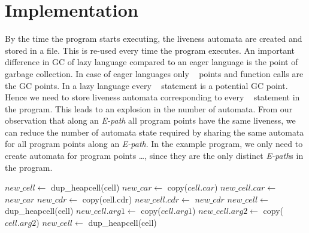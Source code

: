 \documentclass[10pt]{sigplanconf}
\begin{document}
\section{Implementation}
By the time the program starts executing, the liveness automata are created and stored in a file. 
This is re-used every time the program executes. 
An important difference in GC of lazy language compared to an eager language is the point of 
garbage collection. In case of eager languages only \CONS~ points and function calls are 
the GC points. In a lazy language every \LET~ statement is a potential GC point. Hence we need to store 
liveness automata corresponding to every \LET~ statement in the program. This leads to an explosion 
in the number of automata. From our observation that along an {\em E-path} all program points have 
the same liveness, we can reduce the number of automata state required by sharing the same automata 
for all program points along an {\em E-path}. In the example program, we only need to create automata 
for program points \ldots, since they are the only distinct {\em E-path}s in the program. 
\begin{algorithmic}
\STATE $new\_cell\gets$ dup\_heapcell(cell)
\STATE $new\_car\gets$ copy($cell.car$)
\STATE $new\_cell.car\gets$ $new\_car$ 
\STATE $new\_cdr\gets$ copy(cell.cdr)
\STATE $new\_cell.cdr\gets$ $new\_cdr$
\ELSE
{}
\STATE $new\_cell\gets$ dup\_heapcell(cell)
\STATE $new\_cell.arg1\gets$ copy($cell.arg1$)  
\STATE $new\_cell.arg2\gets$ copy($cell.arg2$)  
\ELSE
\STATE $new\_cell\gets$ dup\_heapcell(cell)
\ENDIF
\ENDIF
\end{algorithmic}
\end{document}
